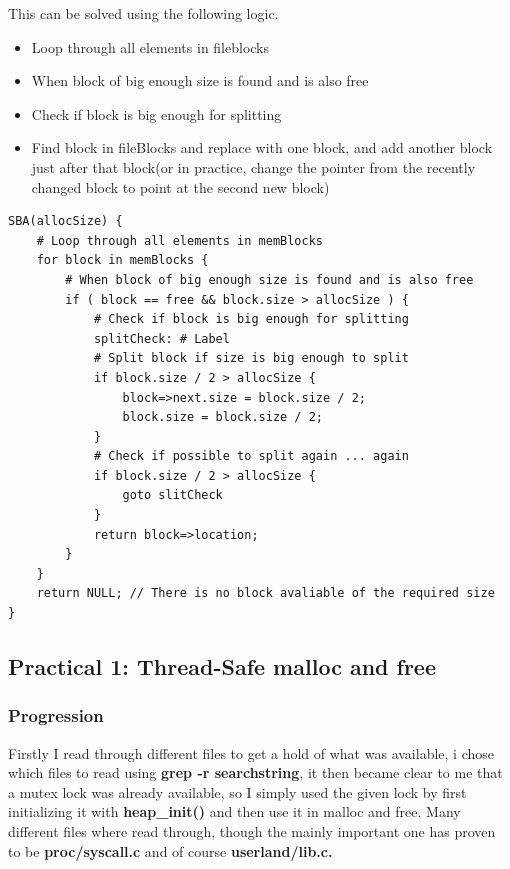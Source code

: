 \documentclass[11pt,a4paper]{article}
\theoremstyle{plain}
\theoremstyle{definition}
\theoremstyle{remark}
\numberwithin{equation}{section}
\begin{document}
This can be solved using the following logic.

\begin{itemize}
\item Loop through all elements in fileblocks
\item When block of big enough size is found and is also free
\item Check if block is big enough for splitting
\item Find block in fileBlocks and replace with one block, and add another block just after that block(or in practice, change the pointer from the recently changed block to point at the second new block)
\end{itemize}

\begin{lstlisting}[caption={Buddy Allocation Algorithm},label={lst:sba}]
SBA(allocSize) {
    # Loop through all elements in memBlocks
    for block in memBlocks {
        # When block of big enough size is found and is also free
        if ( block == free && block.size > allocSize ) {
            # Check if block is big enough for splitting
            splitCheck: # Label
            # Split block if size is big enough to split
            if block.size / 2 > allocSize {
                block=>next.size = block.size / 2;
                block.size = block.size / 2;
            }
            # Check if possible to split again ... again
            if block.size / 2 > allocSize {
                goto slitCheck
            }
            return block=>location;
        }
    }
    return NULL; // There is no block avaliable of the required size
}
\end{lstlisting}


\subsection*{Practical 1: Thread-Safe malloc and free}

\subsubsection*{Progression}

Firstly I read through different files to get a hold of what was available, i chose which files to read using \textbf{grep -r searchstring}, it then became clear to me that a mutex lock was already available, so I simply used the given lock by first initializing it with \textbf{heap\_init()} and then use it in malloc and free. Many different files where read through, though the mainly important one has proven to be \textbf{proc/syscall.c} and of course \textbf{userland/lib.c.}
\end{document}
